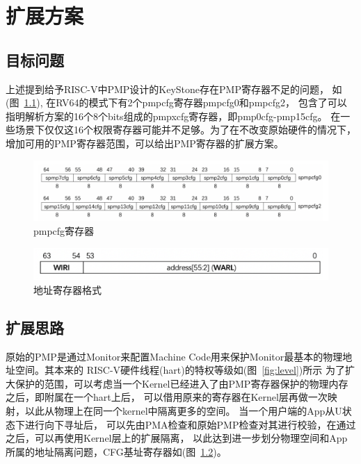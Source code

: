 \label{Chapter5} %
\chapter{扩展方案} %
\section{目标问题}
上述提到给予RISC-V中PMP设计的KeyStone存在PMP寄存器不足的问题，
如(图~\ref{fig:pmpcfg}), 在RV64的模式下有2个pmpcfg寄存器pmpcfg0和pmpcfg2，
包含了可以指明解析方案的16个8个bits组成的pmpxcfg寄存器，即pmp0cfg-pmp15cfg。
在一些场景下仅仅这16个权限寄存器可能并不足够。为了在不改变原始硬件的情况下，
增加可用的PMP寄存器范围，可以给出PMP寄存器的扩展方案。

\begin{figure}
    \centering
    \includegraphics[scale=0.30]{Figures/extend/pmpcfg.png}
    \decoRule
    \caption{pmpcfg寄存器}
    \label{fig:pmpcfg}
\end{figure}

\begin{figure}
    \centering
    \includegraphics[scale=0.30]{Figures/extend/addrformat.png}
    \decoRule
    \caption{地址寄存器格式}
    \label{fig:addrformat}
\end{figure}

\section{扩展思路}
原始的PMP是通过Monitor来配置Machine Code用来保护Monitor最基本的物理地址空间。其本来的
RISC-V硬件线程(hart)的特权等级如(图~\ref{fig:level})所示
为了扩大保护的范围，可以考虑当一个Kernel已经进入了由PMP寄存器保护的物理内存之后，即附属在一个hart上后，
可以借用原来的寄存器在Kernel层再做一次映射，以此从物理上在同一个kernel中隔离更多的空间。
当一个用户端的App从U状态下进行向下寻址后，
可以先由PMA检查和原始PMP检查对其进行校验，在通过之后，可以再使用Kernel层上的扩展隔离，
以此达到进一步划分物理空间和App所属的地址隔离问题，CFG基址寄存器如(图~\ref{fig:addrformat})。

